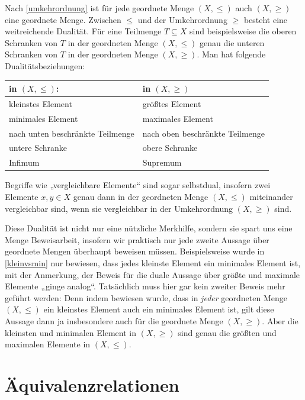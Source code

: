 \begin{bem} \label{ordnungsdualitaet} 
    Nach \cref{umkehrordnung} ist für jede geordnete Menge $(X,\le)$ auch $(X,\ge)$ eine geordnete Menge. Zwischen $\le$ und der Umkehrordnung $\ge$ besteht eine weitreichende Dualität. Für eine Teilmenge $T\subseteq X$ sind beispielsweise die oberen Schranken von $T$ in der geordneten Menge $(X,\le)$ genau die unteren Schranken von $T$ in der geordneten Menge $(X,\ge)$. Man hat folgende Dualitätsbeziehungen:
    \begin{center}
    \begin{tabular}{ll}
        in $(X,\le)$: & in $(X,\ge)$ \\
        \midrule
        kleinstes Element & größtes Element \\
        minimales Element & maximales Element \\
        nach unten beschränkte Teilmenge & nach oben beschränkte Teilmenge \\
        untere Schranke & obere Schranke \\
        Infimum & Supremum
    \end{tabular}
    \end{center}
    Begriffe wie „vergleichbare Elemente“ sind sogar selbstdual, insofern zwei Elemente $x,y\in X$ genau dann in der geordneten Menge $(X,\le)$ miteinander vergleichbar sind, wenn sie vergleichbar in der Umkehrordnung $(X,\ge)$ sind.

    Diese Dualität ist nicht nur eine nützliche Merkhilfe, sondern sie spart uns eine Menge Beweisarbeit, insofern wir praktisch nur jede zweite Aussage über geordnete Mengen überhaupt beweisen müssen. Beispielsweise wurde in \cref{kleinvsmin} nur bewiesen, dass jedes kleinste Element ein minimales Element ist, mit der Anmerkung, der Beweis für die duale Aussage über größte und maximale Elemente „ginge analog“. Tatsächlich muss hier gar kein zweiter Beweis mehr geführt werden: Denn indem bewiesen wurde, dass in \emph{jeder} geordneten Menge $(X,\le)$ ein kleinstes Element auch ein minimales Element ist, gilt diese Aussage dann ja insbesondere auch für die geordnete Menge $(X,\ge)$. Aber die kleinsten und minimalen Element in $(X,\ge)$ sind genau die größten und maximalen Elemente in $(X,\le)$.
\end{bem}





\section{Äquivalenzrelationen}


